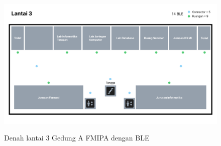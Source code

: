\begin{enumerate}
\begin{figure}[H]
\centering
{\includegraphics [scale = 0.2]{gambar/bab4/Denah-3-BLE}}
\caption{Denah lantai 3 Gedung A FMIPA dengan BLE}
\label{img:denah_3_ble}
\end{figure}
    
	\end{enumerate}
	
	
	
	
